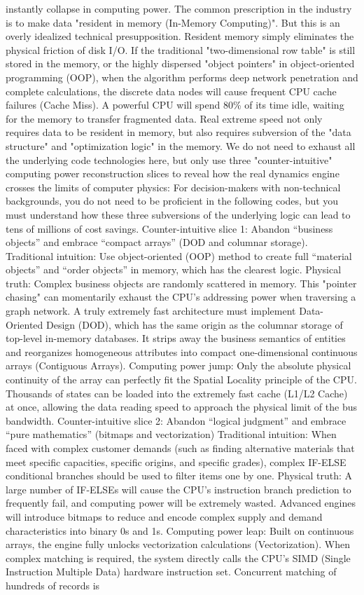 \documentclass[11pt,a4paper]{article}
\begin{document}
instantly collapse in computing power. The common prescription in the industry is to make data "resident in memory (In-Memory Computing)". But this is an overly idealized technical presupposition. Resident memory simply eliminates the physical friction of disk I/O. If the traditional "two-dimensional row table" is still stored in the memory, or the highly dispersed "object pointers" in object-oriented programming (OOP), when the algorithm performs deep network penetration and complete calculations, the discrete data nodes will cause frequent CPU cache failures (Cache Miss). A powerful CPU will spend 80\% of its time idle, waiting for the memory to transfer fragmented data. Real extreme speed not only requires data to be resident in memory, but also requires subversion of the "data structure" and "optimization logic" in the memory. We do not need to exhaust all the underlying code technologies here, but only use three "counter-intuitive" computing power reconstruction slices to reveal how the real dynamics engine crosses the limits of computer physics: For decision-makers with non-technical backgrounds, you do not need to be proficient in the following codes, but you must understand how these three subversions of the underlying logic can lead to tens of millions of cost savings. Counter-intuitive slice 1: Abandon “business objects” and embrace “compact arrays” (DOD and columnar storage). Traditional intuition: Use object-oriented (OOP) method to create full “material objects” and “order objects” in memory, which has the clearest logic. Physical truth: Complex business objects are randomly scattered in memory. This "pointer chasing" can momentarily exhaust the CPU's addressing power when traversing a graph network. A truly extremely fast architecture must implement Data-Oriented Design (DOD), which has the same origin as the columnar storage of top-level in-memory databases. It strips away the business semantics of entities and reorganizes homogeneous attributes into compact one-dimensional continuous arrays (Contiguous Arrays). Computing power jump: Only the absolute physical continuity of the array can perfectly fit the Spatial Locality principle of the CPU. Thousands of states can be loaded into the extremely fast cache (L1/L2 Cache) at once, allowing the data reading speed to approach the physical limit of the bus bandwidth. Counter-intuitive slice 2: Abandon “logical judgment” and embrace “pure mathematics” (bitmaps and vectorization) Traditional intuition: When faced with complex customer demands (such as finding alternative materials that meet specific capacities, specific origins, and specific grades), complex IF-ELSE conditional branches should be used to filter items one by one. Physical truth: A large number of IF-ELSEs will cause the CPU's instruction branch prediction to frequently fail, and computing power will be extremely wasted. Advanced engines will introduce bitmaps to reduce and encode complex supply and demand characteristics into binary 0s and 1s. Computing power leap: Built on continuous arrays, the engine fully unlocks vectorization calculations (Vectorization). When complex matching is required, the system directly calls the CPU's SIMD (Single Instruction Multiple Data) hardware instruction set. Concurrent matching of hundreds of records is 
\end{document}
